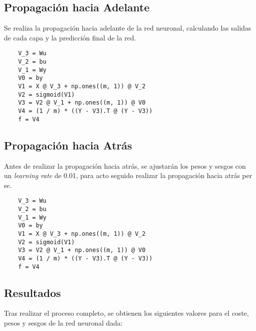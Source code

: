 \documentclass[paper=a4, fontsize=11pt]{scrartcl} %
\numberwithin{equation}{section} %
\numberwithin{figure}{section} %
\numberwithin{table}{section} %
\begin{document}
\subsection{Propagación hacia Adelante}

Se realiza la propagación hacia adelante de la red neuronal, calculando las salidas de cada capa y la predicción final de la red. 

\vspace{2mm}
\begin{lstlisting}
    V_3 = Wu
    V_2 = bu
    V_1 = Wy
    V0 = by
    V1 = X @ V_3 + np.ones((m, 1)) @ V_2
    V2 = sigmoid(V1)
    V3 = V2 @ V_1 + np.ones((m, 1)) @ V0
    V4 = (1 / m) * ((Y - V3).T @ (Y - V3))
    f = V4
\end{lstlisting}
\vspace{2mm}

\subsection{Propagación hacia Atrás}

Antes de realizar la propagación hacia atrás, se ajustarán los pesos y sesgos con un \textit{learning rate} de 0.01, para acto seguido realizar la propagación hacia atrás per se.

\vspace{2mm}
\begin{lstlisting}
    V_3 = Wu
    V_2 = bu
    V_1 = Wy
    V0 = by
    V1 = X @ V_3 + np.ones((m, 1)) @ V_2
    V2 = sigmoid(V1)
    V3 = V2 @ V_1 + np.ones((m, 1)) @ V0
    V4 = (1 / m) * ((Y - V3).T @ (Y - V3))
    f = V4
\end{lstlisting}
\vspace{2mm}

\subsection{Resultados}

Tras realizar el proceso completo, se obtienen los siguientes valores para el coste, pesos y sesgos de la red neuronal dada:
\end{document}
